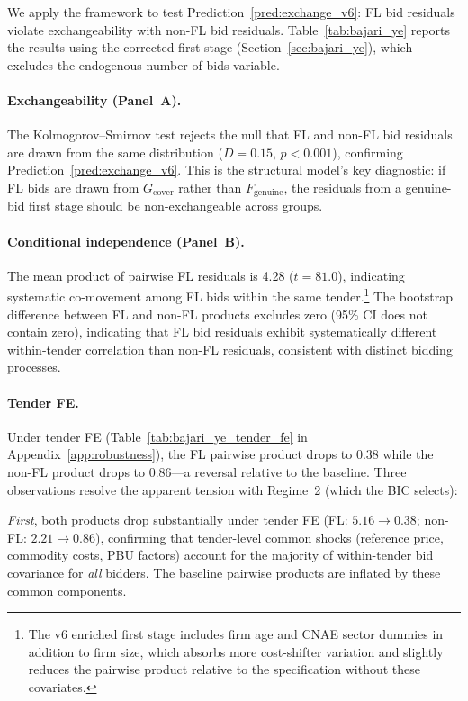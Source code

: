 We apply the \citet{bajari2003deciding} framework to test
Prediction~\ref{pred:exchange_v6}: FL bid residuals violate
exchangeability with non-FL bid residuals.
Table~\ref{tab:bajari_ye} reports the results using the corrected
first stage (Section~\ref{sec:bajari_ye}), which excludes the
endogenous number-of-bids variable.



\paragraph{Exchangeability (Panel~A).}
The Kolmogorov--Smirnov test rejects the null that FL and
non-FL bid residuals are drawn from the same distribution
($D = 0.15$, $p < 0.001$), confirming
Prediction~\ref{pred:exchange_v6}. This is the structural model's
key diagnostic: if FL bids are drawn from $G_{\text{cover}}$ rather
than $F_{\text{genuine}}$, the residuals from a genuine-bid first
stage should be non-exchangeable across groups.

\paragraph{Conditional independence (Panel~B).}
The mean product of pairwise FL residuals is 4.28 ($t = 81.0$), %
indicating systematic co-movement among FL bids within the same
tender.\footnote{The v6 enriched first stage includes firm age and
CNAE sector dummies in addition to firm size, which absorbs more
cost-shifter variation and slightly reduces the pairwise product
relative to the specification without these covariates.}
The bootstrap difference between FL and non-FL products excludes zero
(95\% CI does not contain zero), indicating that FL bid residuals
exhibit systematically different within-tender correlation than non-FL
residuals, consistent with distinct bidding processes.

\paragraph{Tender FE.} %
Under tender FE (Table~\ref{tab:bajari_ye_tender_fe} in
Appendix~\ref{app:robustness}), the FL pairwise product drops to
0.38 while the non-FL product drops to 0.86---a reversal relative to
the baseline. Three observations resolve the apparent tension with
Regime~2 (which the BIC selects):

\emph{First}, both products drop substantially under tender FE (FL:
$5.16 \to 0.38$; non-FL: $2.21 \to 0.86$), confirming that
tender-level common shocks (reference price, commodity costs, PBU
factors) account for the majority of within-tender bid covariance for
\emph{all} bidders. The baseline pairwise products are inflated by
these common components.


